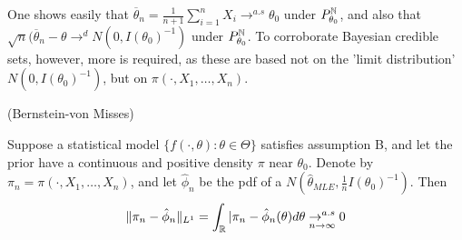 \documentclass[a4paper]{article}
\begin{document}
One shows easily that $\overline{\theta}_n = \frac{1}{n+1} \sum_{i=1}^{n} X_i \to^{a.s} \theta_0 $ under $P_{\theta_0}^{\mathbb{N}}$, and also that $\sqrt{n}(\overline{\theta}_n - \theta \to ^{d} N(0, I(\theta_0)^{-1})$ under $P_{\theta_0}^{\mathbb{N}}$. To corroborate Bayesian credible sets, however, more is required, as these are based not on the 'limit distribution' $N(0, I(\theta_0)^{-1})$, but on $\pi(\cdot , X_1, \ldots, X_n)$.

\begin{thm}(Bernstein-von Misses)
	
	Suppose a statistical model $\{f\left( \cdot , \theta \right) : \theta \in \Theta \}$ satisfies assumption B, and let the prior have a continuous and positive density $\pi$ near $\theta_0$. Denote by $\pi_n = \pi(\cdot , X_1, \ldots, X_n)$, and let $\hat{\phi}_n$ be the pdf of a $N(\hat{\theta}_{MLE}, \frac{1}{n}I(\theta_0)^{-1})$. Then
	\[
		\|\pi_n - \hat{\phi}_n\|_{L^{1}} = \int_{\mathbb{R}} |\pi_n - \hat{\phi}_n(\theta)d\theta \underset{n\to \infty}{\to ^{a.s}} 0
	\] 
\end{thm}
\end{document}
